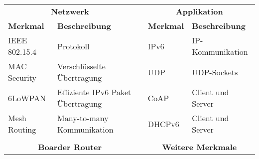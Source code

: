 \begin{table}[H]
	\centering
	\begin{adjustbox}{width=1\textwidth}
	\begin{tabular}{@{}lllll@{}}
		\cmidrule(r){1-2} \cmidrule(l){4-5}
		\multicolumn{2}{|c|}{\textbf{Netzwerk}}                                                              & \multicolumn{1}{l|}{} & \multicolumn{2}{c|}{\textbf{Applikation}}                                                                           \\ \cmidrule(r){1-2} \cmidrule(l){4-5} 
		\multicolumn{1}{|l|}{\textbf{Merkmal}}      & \multicolumn{1}{l|}{\textbf{Beschreibung}}             & \multicolumn{1}{l|}{} & \multicolumn{1}{l|}{\textbf{Merkmal}}                   & \multicolumn{1}{l|}{\textbf{Beschreibung}}                \\ \cmidrule(r){1-2} \cmidrule(l){4-5} 
		\multicolumn{1}{|l|}{IEEE 802.15.4}         & \multicolumn{1}{l|}{Protokoll}                         & \multicolumn{1}{l|}{} & \multicolumn{1}{l|}{IPv6}                               & \multicolumn{1}{l|}{IP-Kommunikation}                     \\ \cmidrule(r){1-2} \cmidrule(l){4-5} 
		\multicolumn{1}{|l|}{MAC Security}          & \multicolumn{1}{l|}{Verschlüsselte Übertragung}        & \multicolumn{1}{l|}{} & \multicolumn{1}{l|}{UDP}                                & \multicolumn{1}{l|}{UDP-Sockets}                          \\ \cmidrule(r){1-2} \cmidrule(l){4-5} 
		\multicolumn{1}{|l|}{6LoWPAN}               & \multicolumn{1}{l|}{Effiziente IPv6 Paket Übertragung} & \multicolumn{1}{l|}{} & \multicolumn{1}{l|}{CoAP}                               & \multicolumn{1}{l|}{Client und Server}                    \\ \cmidrule(r){1-2} \cmidrule(l){4-5} 
		\multicolumn{1}{|l|}{Mesh Routing}          & \multicolumn{1}{l|}{Many-to-many Kommunikation}        & \multicolumn{1}{l|}{} & \multicolumn{1}{l|}{DHCPv6}                             & \multicolumn{1}{l|}{Client und Server}                    \\ \cmidrule(r){1-2} \cmidrule(l){4-5} 
		&                                                        &                       &                                                         &                                                           \\ \cmidrule(r){1-2} \cmidrule(l){4-5} 
		\multicolumn{2}{|c|}{\textbf{Boarder Router}}                                                        & \multicolumn{1}{l|}{} & \multicolumn{2}{c|}{\textbf{Weitere Merkmale}}                                                                      \\ \cmidrule(r){1-2} \cmidrule(l){4-5} 

\end{tabular}
\end{adjustbox}
\end{table}
